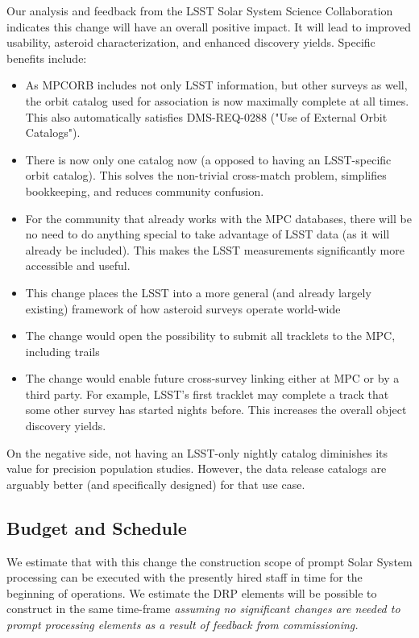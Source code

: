 \documentclass[DM,authoryear,toc,lsstdraft]{lsstdoc}
\begin{document}
Our analysis and feedback from the LSST Solar System Science Collaboration indicates this change will have an overall positive impact. It will lead to improved usability, asteroid characterization, and enhanced discovery yields. Specific benefits include:
%
\begin{itemize}
\item As MPCORB includes not only LSST information, but other surveys as well, the orbit catalog used for association is now maximally complete at all times. This also automatically satisfies DMS-REQ-0288 ("Use of External Orbit Catalogs").
\item There is now only one catalog now (a opposed to having an LSST-specific orbit catalog). This solves the non-trivial cross-match problem, simplifies bookkeeping, and reduces community confusion.
\item For the community that already works with the MPC databases, there will be no need to do anything special to take advantage of LSST data (as it will already be included). This makes the LSST measurements significantly more accessible and useful.
\item This change places the LSST into a more general (and already largely existing) framework of how asteroid surveys operate
world-wide
\item The change would open the possibility to submit all tracklets to the MPC, including trails
\item The change would enable future cross-survey linking either at MPC or by a third party. For example, LSST’s first tracklet may complete a track that some other survey has started nights before. This increases the overall object discovery yields.
\end{itemize}

On the negative side, not having an LSST-only nightly catalog diminishes its value for precision population studies. However, the data release catalogs are arguably better (and specifically designed) for that use case.

\subsection{Budget and Schedule}

We estimate that with this change the construction scope of prompt Solar System processing can be executed with the presently hired staff in time for the beginning of operations. We estimate the DRP elements will be possible to construct in the same time-frame {\em assuming no significant changes are needed to prompt processing elements as a result of feedback from commissioning.}
\end{document}
